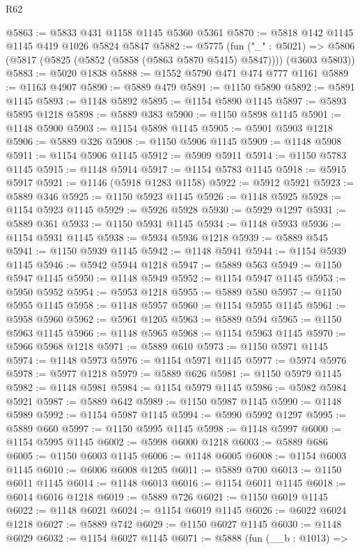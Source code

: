 \begin{lexlean}{R62}
\begin{coremodule}
@5863 := @5833 @431 @1158 @1145 @5360 @5361
@5870 := @5818 @142 @1145 @1145 @419 @1026 @5824 @5847
@5882 := @5775
    (fun ("_" : @5021) =>
    @5806 (@5817 (@5825 (@5852 (@5858 (@5863 @5870 @5415) @5847)))) (@3603 @5803))
@5883 := @5020 @1838
@5888 := @1552 @5790 @471 @474 @777 @1161
@5889 := @1163 @4907
@5890 := @5889 @479
@5891 := @1150 @5890
@5892 := @5891 @1145
@5893 := @1148 @5892
@5895 := @1154 @5890 @1145
@5897 := @5893 @5895 @1218
@5898 := @5889 @383
@5900 := @1150 @5898 @1145
@5901 := @1148 @5900
@5903 := @1154 @5898 @1145
@5905 := @5901 @5903 @1218
@5906 := @5889 @326
@5908 := @1150 @5906 @1145
@5909 := @1148 @5908
@5911 := @1154 @5906 @1145
@5912 := @5909 @5911
@5914 := @1150 @5783 @1145
@5915 := @1148 @5914
@5917 := @1154 @5783 @1145
@5918 := @5915 @5917
@5921 := @1146 (@5918 @1283 @1158)
@5922 := @5912 @5921
@5923 := @5889 @346
@5925 := @1150 @5923 @1145
@5926 := @1148 @5925
@5928 := @1154 @5923 @1145
@5929 := @5926 @5928
@5930 := @5929 @1297
@5931 := @5889 @361
@5933 := @1150 @5931 @1145
@5934 := @1148 @5933
@5936 := @1154 @5931 @1145
@5938 := @5934 @5936 @1218
@5939 := @5889 @545
@5941 := @1150 @5939 @1145
@5942 := @1148 @5941
@5944 := @1154 @5939 @1145
@5946 := @5942 @5944 @1218
@5947 := @5889 @563
@5949 := @1150 @5947 @1145
@5950 := @1148 @5949
@5952 := @1154 @5947 @1145
@5953 := @5950 @5952
@5954 := @5953 @1218
@5955 := @5889 @580
@5957 := @1150 @5955 @1145
@5958 := @1148 @5957
@5960 := @1154 @5955 @1145
@5961 := @5958 @5960
@5962 := @5961 @1205
@5963 := @5889 @594
@5965 := @1150 @5963 @1145
@5966 := @1148 @5965
@5968 := @1154 @5963 @1145
@5970 := @5966 @5968 @1218
@5971 := @5889 @610
@5973 := @1150 @5971 @1145
@5974 := @1148 @5973
@5976 := @1154 @5971 @1145
@5977 := @5974 @5976
@5978 := @5977 @1218
@5979 := @5889 @626
@5981 := @1150 @5979 @1145
@5982 := @1148 @5981
@5984 := @1154 @5979 @1145
@5986 := @5982 @5984 @5921
@5987 := @5889 @642
@5989 := @1150 @5987 @1145
@5990 := @1148 @5989
@5992 := @1154 @5987 @1145
@5994 := @5990 @5992 @1297
@5995 := @5889 @660
@5997 := @1150 @5995 @1145
@5998 := @1148 @5997
@6000 := @1154 @5995 @1145
@6002 := @5998 @6000 @1218
@6003 := @5889 @686
@6005 := @1150 @6003 @1145
@6006 := @1148 @6005
@6008 := @1154 @6003 @1145
@6010 := @6006 @6008 @1205
@6011 := @5889 @700
@6013 := @1150 @6011 @1145
@6014 := @1148 @6013
@6016 := @1154 @6011 @1145
@6018 := @6014 @6016 @1218
@6019 := @5889 @726
@6021 := @1150 @6019 @1145
@6022 := @1148 @6021
@6024 := @1154 @6019 @1145
@6026 := @6022 @6024 @1218
@6027 := @5889 @742
@6029 := @1150 @6027 @1145
@6030 := @1148 @6029
@6032 := @1154 @6027 @1145
@6071 := @5888
    (fun (__b : @1013) =>

\end{coremodule}
\end{lexlean}
